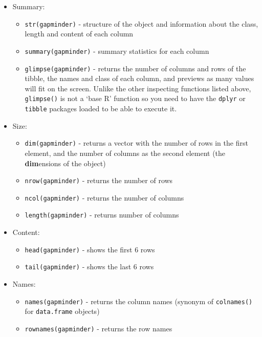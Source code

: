 \documentclass[
]{book}
\providecommand{\tightlist}{%
  \setlength{\itemsep}{0pt}\setlength{\parskip}{0pt}}
\begin{document}
\begin{itemize}
\tightlist
\item
  Summary:

  \begin{itemize}
  \tightlist
  \item
    \texttt{str(gapminder)} - structure of the object and information about the class, length and
    content of each column
  \item
    \texttt{summary(gapminder)} - summary statistics for each column
  \item
    \texttt{glimpse(gapminder)} - returns the number of columns and rows of the tibble, the names and class of each column, and previews as many values will fit on the screen. Unlike the other inspecting functions listed above, \texttt{glimpse()} is not a `base R' function so you need to have the \texttt{dplyr} or \texttt{tibble} packages loaded to be able to execute it.
  \end{itemize}
\item
  Size:

  \begin{itemize}
  \tightlist
  \item
    \texttt{dim(gapminder)} - returns a vector with the number of rows in the first element,
    and the number of columns as the second element (the \textbf{dim}ensions of
    the object)
  \item
    \texttt{nrow(gapminder)} - returns the number of rows
  \item
    \texttt{ncol(gapminder)} - returns the number of columns
  \item
    \texttt{length(gapminder)} - returns number of columns
  \end{itemize}
\item
  Content:

  \begin{itemize}
  \tightlist
  \item
    \texttt{head(gapminder)} - shows the first 6 rows
  \item
    \texttt{tail(gapminder)} - shows the last 6 rows
  \end{itemize}
\item
  Names:

  \begin{itemize}
  \tightlist
  \item
    \texttt{names(gapminder)} - returns the column names (synonym of \texttt{colnames()} for \texttt{data.frame}
    objects)
  \item
    \texttt{rownames(gapminder)} - returns the row names
  \end{itemize}
\end{itemize}
\end{document}
